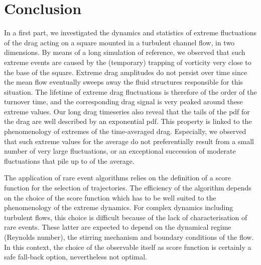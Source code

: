 \documentclass{jfm}
\newcommand{\EL}[1]{{\color{myred}{#1}}}
\begin{document}
\section{Conclusion}
\label{conlusion}


In a first part, we investigated the dynamics and statistics of extreme fluctuations of the drag acting on a square mounted in a turbulent channel flow, in two dimensions.
By means of a long simulation of reference, we observed that such extreme events are caused by the (temporary) trapping of vorticity very close to the base of the square.
Extreme drag amplitudes do not persist over time since the mean flow eventually sweeps away the fluid structures responsible for this situation.
%
The lifetime of extreme drag fluctuations is therefore of the order of the turnover time, and the corresponding drag signal is very peaked around these extreme values.
Our long drag timeseries also reveal that the tails of the \ac{pdf} for the drag are well described by an exponential \ac{pdf}.
This property is linked to the phenomenology of extremes of the time-averaged drag.
Especially, we observed that such extreme values for the average do not preferentially result from a small number of very large fluctuations, or an exceptional succession of moderate fluctuations that pile up to \EL{yield a large value} of the average.

The application of rare event algorithms relies on the definition of a score function for the selection of trajectories.
The efficiency of the algorithm depends on the choice of the score function which has to be well suited to the phenomenology of the extreme dynamics.
For complex dynamics including turbulent flows, this choice is  difficult because of the lack of characterisation of rare events. These latter are expected to depend on the dynamical regime (Reynolds number), the stirring mechanism and boundary conditions of the flow. In this context, the choice of the observable itself as score function is certainly a safe fall-back option, nevertheless not optimal.
\end{document}
